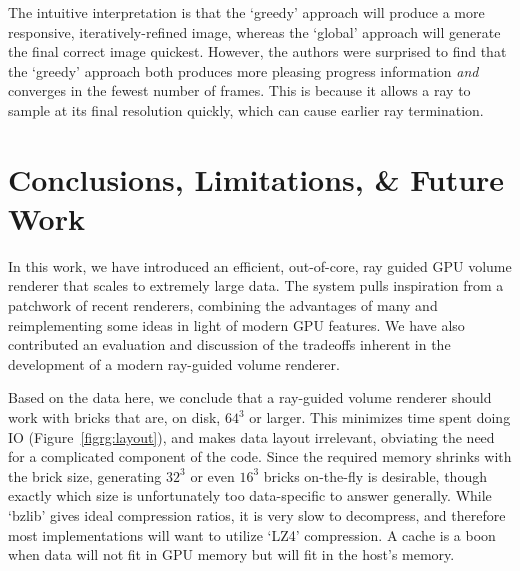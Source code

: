 



The intuitive interpretation is that the `greedy' approach will produce
a more responsive, iteratively-refined image, whereas the `global'
approach will generate the final correct image quickest.  However, the
authors were surprised to find that the `greedy' approach both produces
more pleasing progress information \emph{and} converges in the fewest
number of frames.  This is because it allows a ray to sample at its
final resolution quickly, which can cause earlier ray termination.

\section{Conclusions, Limitations, \& Future Work}
\label{sec:rg-conclusion}

In this work, we have introduced an efficient, out-of-core, ray guided
GPU volume renderer that scales to extremely large data.  The system
pulls inspiration from a patchwork of recent renderers, combining the
advantages of many and reimplementing some ideas in light of modern GPU
features.  We have also contributed an evaluation and discussion of the
tradeoffs inherent in the development of a modern ray-guided volume
renderer.

Based on the data here, we conclude that a ray-guided volume renderer
should work with bricks that are, on disk, $64^3$ or larger.  This
minimizes time spent doing IO (Figure~\ref{figrg:layout}), and makes
data layout irrelevant, obviating the need for a complicated component
of the code.  Since the required memory shrinks with the brick size,
generating $32^3$ or even $16^3$ bricks on-the-fly is desirable,
though exactly which size is unfortunately too data-specific to answer
generally.  While `bzlib' gives ideal compression ratios, it is very
slow to decompress, and therefore most implementations will want to
utilize `LZ4' compression.  A cache is a boon when data will not fit in
GPU memory but will fit in the host's memory.

